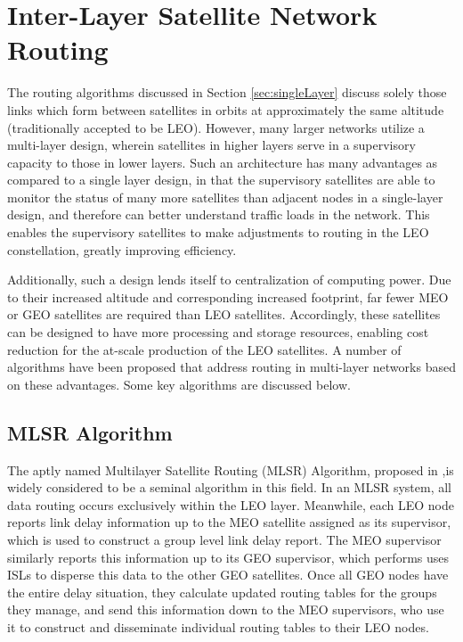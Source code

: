 
\section{Inter-Layer Satellite Network Routing}\label{sec:interLayer}
The routing algorithms discussed in Section \ref{sec:singleLayer} discuss solely those links which form between satellites in orbits at approximately the same altitude (traditionally accepted to be LEO). However, many larger networks utilize a multi-layer design, wherein satellites in higher layers serve in a supervisory capacity to those in lower layers. Such an architecture has many advantages as compared to a single layer design, in that the supervisory satellites are able to monitor the status of many more satellites than adjacent nodes in a single-layer design, and therefore can better understand traffic loads in the network. This enables the supervisory satellites to make adjustments to routing in the LEO constellation, greatly improving efficiency. 

Additionally, such a design lends itself to centralization of computing power. Due to their increased altitude and corresponding increased footprint, far fewer MEO or GEO satellites are required than LEO satellites. Accordingly, these satellites can be designed to have more processing and storage resources, enabling cost reduction for the at-scale production of the LEO satellites. A number of algorithms have been proposed that address routing in multi-layer networks based on these advantages. Some key algorithms are discussed below.

\subsection{MLSR Algorithm}\label{subsec:mlsr}
The aptly named Multilayer Satellite Routing (MLSR) Algorithm, proposed in \cite{akyildiz_mlsr_2002},is widely considered to be a seminal algorithm in this field. In an MLSR system, all data routing occurs exclusively within the LEO layer. Meanwhile, each LEO node reports link delay information up to the MEO satellite assigned as its supervisor, which is used to construct a group level link delay report. The MEO supervisor similarly reports this information up to its GEO supervisor, which performs uses ISLs to disperse this data to the other GEO satellites. Once all GEO nodes have the entire delay situation, they calculate updated routing tables for the groups they manage, and send this information down to the MEO supervisors, who use it to construct and disseminate individual routing tables to their LEO nodes.

